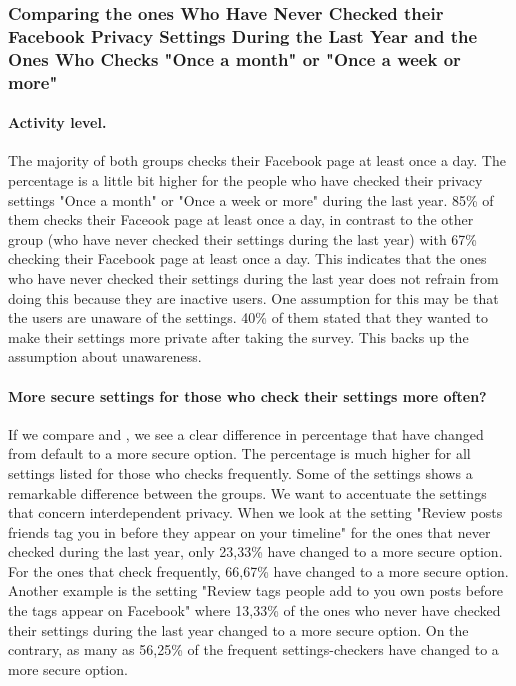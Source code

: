 \subsubsection{Comparing the ones Who Have Never Checked their Facebook Privacy Settings During the Last Year and the Ones Who Checks "Once a month" or "Once a week or more"} 

\paragraph{Activity level.}
The majority of both groups checks their Facebook page at least once a day. The percentage is a little bit higher for the people who have checked their privacy settings "Once a month" or "Once a week or more" during the last year. 85\% of them checks their Faceook page at least once a day, in contrast to the other group (who have never checked their settings during the last year) with 67\% checking their Facebook page at least once a day. This indicates that the ones who have never checked their settings during the last year does not refrain from doing this because they are inactive users. One assumption for this may be that the users are unaware of the settings. 40\% of them stated that they wanted to make their settings more private after taking the survey. This backs up the assumption about unawareness.  

\paragraph{More secure settings for those who check their settings more often?}
If we compare  and , we see a clear difference in percentage that have changed from default to a more secure option. The percentage is much higher for all settings listed for those who checks frequently. Some of the settings shows a remarkable difference between the groups. We want to accentuate the settings that concern interdependent privacy. When we look at the setting "Review posts friends tag you in before they appear on your timeline" for the ones that never checked during the last year, only 23,33\% have changed to a more secure option. For the ones that check frequently, 66,67\% have changed to a more secure option. Another example is the setting "Review tags people add to you own posts before the tags appear on Facebook" where 13,33\% of the ones who never have checked their settings during the last year changed to a more secure option. On the contrary, as many as 56,25\% of the frequent settings-checkers have changed to a more secure option.

